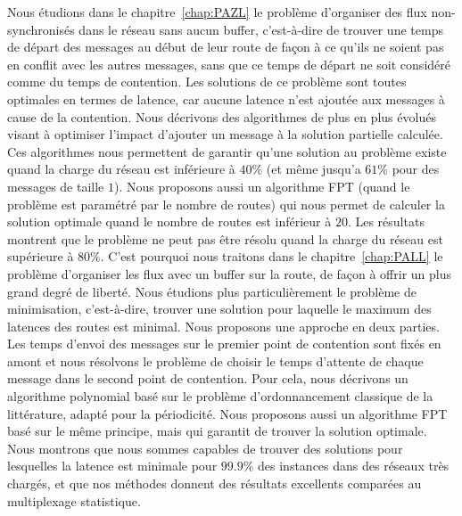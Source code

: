 Nous étudions dans le chapitre~\ref{chap:PAZL} le problème d'organiser des flux non-synchronisés dans le réseau sans aucun buffer, c’est-à-dire de trouver une temps de départ des messages au début de leur route de façon à ce qu'ils ne soient pas en conflit avec les autres messages, sans que ce temps de départ ne soit considéré comme du temps de contention. Les solutions de ce problème sont toutes optimales en termes de latence, car aucune latence n'est ajoutée aux messages à cause de la contention. Nous décrivons des algorithmes de plus en plus évolués visant à optimiser l'impact d'ajouter un message à la solution partielle calculée. Ces algorithmes nous permettent de garantir qu'une solution au problème existe quand la charge du réseau est inférieure à $40\%$ (et même jusqu'a $61\%$ pour des messages de taille $1$). Nous proposons aussi un algorithme FPT (quand le problème est paramétré par le nombre de routes) qui nous permet de calculer la solution optimale quand le nombre de routes est inférieur à $20$. Les résultats montrent que le problème ne peut pas être résolu quand la charge du réseau est supérieure à $80\%$.
C'est pourquoi nous traitons dans le chapitre~\ref{chap:PALL} le problème d'organiser les flux avec un buffer sur la route, de façon à offrir un plus grand degré de liberté. Nous étudions plus particulièrement le problème de minimisation, c'est-à-dire, trouver une solution pour laquelle le maximum des latences des routes est minimal. Nous proposons une approche en deux parties. Les temps d'envoi des messages sur le premier point de contention sont fixés en amont et nous résolvons le problème de choisir le temps d'attente de chaque message dans le second point de contention. Pour cela, nous décrivons un algorithme polynomial basé sur le problème d'ordonnancement classique de la littérature, adapté pour la périodicité. Nous proposons aussi un algorithme FPT basé sur le même principe, mais qui garantit de trouver la solution optimale. Nous montrons que nous sommes capables de trouver des solutions pour lesquelles la latence est minimale pour $99.9\%$ des instances dans des réseaux très chargés, et que nos méthodes donnent des résultats excellents comparées au multiplexage statistique.

